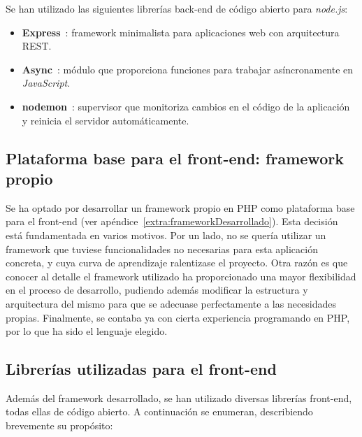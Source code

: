 Se han utilizado las siguientes librerías \gls{back-end} de código abierto para \textit{node.js}:

\begin{itemize}
  \item \textbf{Express}~\cite{express}: \gls{framework} minimalista para aplicaciones web con arquitectura \gls{REST}.

  \item \textbf{Async}~\cite{async}: módulo que proporciona funciones para trabajar asíncronamente en \textit{JavaScript}.

  \item \textbf{nodemon}~\cite{nodemon}: supervisor que monitoriza cambios en el código de la aplicación y reinicia el servidor automáticamente.

\end{itemize}

\subsection*{Plataforma base para el \gls{front-end}: \gls{framework} propio\label{ssec:dp:front-end}}

Se ha optado por desarrollar un \gls{framework} propio en \gls{PHP} como plataforma base para el \gls{front-end} (ver apéndice~\ref{extra:frameworkDesarrollado}).
Esta decisión está fundamentada en varios motivos.
Por un lado, no se quería utilizar un \gls{framework} que tuviese funcionalidades no necesarias para esta aplicación concreta, y cuya curva de aprendizaje ralentizase el proyecto.
Otra razón es que conocer al detalle el \gls{framework} utilizado ha proporcionado una mayor flexibilidad en el proceso de desarrollo, pudiendo además modificar la estructura y arquitectura del mismo para que se adecuase perfectamente a las necesidades propias.
Finalmente, se contaba ya con cierta experiencia programando en \gls{PHP}, por lo que ha sido el lenguaje elegido.

\subsection*{Librerías utilizadas para el \gls{front-end}\label{ssec:dp:front-end-libs}}

Además del \gls{framework} desarrollado, se han utilizado diversas librerías \gls{front-end}, todas ellas de código abierto. A continuación se enumeran, describiendo brevemente su propósito:

